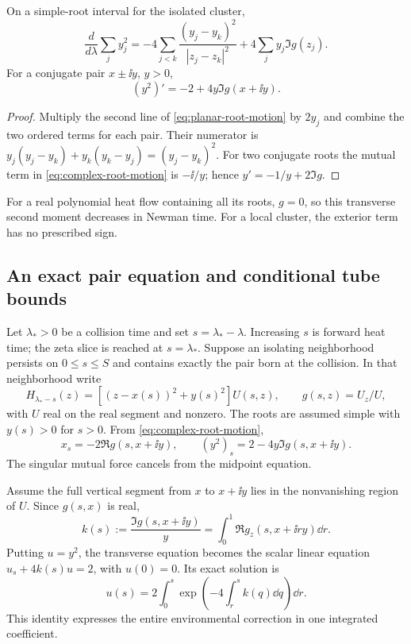 \begin{proposition}\label{prop:transverse-balance}
On a simple-root interval for the isolated cluster,
\begin{equation}\label{eq:transverse-balance}
 \frac{d}{d\lambda}\sum_j y_j^2
 =-4\sum_{j<k}\frac{(y_j-y_k)^2}{|z_j-z_k|^2}
                      +4\sum_j y_j\Im g(z_j).
\end{equation}
For a conjugate pair \(x\pm\ii y\), \(y>0\),
\begin{equation}\label{eq:conjugate-pair-height}
 (y^2)'=-2+4y\Im g(x+\ii y).
\end{equation}
\end{proposition}
\begin{proof}
Multiply the second line of \eqref{eq:planar-root-motion} by \(2y_j\)
and combine the two ordered terms for each pair. Their numerator is
\(y_j(y_j-y_k)+y_k(y_k-y_j)=(y_j-y_k)^2\).
For two conjugate roots the mutual term in \eqref{eq:complex-root-motion}
is \(-\ii/y\); hence \(y'=-1/y+2\Im g\).
\end{proof}
For a real polynomial heat flow containing all its roots, \(g=0\),
so this transverse second moment decreases in Newman time. For a local
cluster, the exterior term has no prescribed sign.

\subsection{An exact pair equation and conditional tube bounds}
Let \(\lambda_*>0\) be a collision time and set
\(s=\lambda_*-\lambda\). Increasing \(s\) is forward heat time;
the zeta slice is reached at \(s=\lambda_*\). Suppose an isolating
neighborhood persists on \(0\le s\le S\) and contains exactly the
pair born at the collision. In that neighborhood write
\begin{equation}\label{eq:tube-factor}
 H_{\lambda_*-s}(z)=[(z-x(s))^2+y(s)^2]U(s,z),\qquad
 g(s,z)=U_z/U,
\end{equation}
with \(U\) real on the real segment and nonzero. The roots are assumed
simple with \(y(s)>0\) for \(s>0\). From
\eqref{eq:complex-root-motion},
\begin{equation}\label{eq:pair-s-motion}
 x_s=-2\Re g(s,x+\ii y),\qquad
 (y^2)_s=2-4y\Im g(s,x+\ii y).
\end{equation}
The singular mutual force cancels from the midpoint equation.

Assume the full vertical segment from \(x\) to \(x+\ii y\) lies in
the nonvanishing region of \(U\). Since \(g(s,x)\) is real,
\begin{equation}\label{eq:tube-k}
 k(s):=\frac{\Im g(s,x+\ii y)}{y}
       =\int_0^1\Re g_z(s,x+\ii r y)\dd r.
\end{equation}
Putting \(u=y^2\), the transverse equation becomes the scalar linear
equation \(u_s+4k(s)u=2\), with \(u(0)=0\). Its exact solution is
\begin{equation}\label{eq:tube-integrating-factor}
 u(s)=2\int_0^s\exp\!\left(-4\int_r^s k(q)\dd q\right)\dd r.
\end{equation}
This identity expresses the entire environmental correction in one
integrated coefficient.

